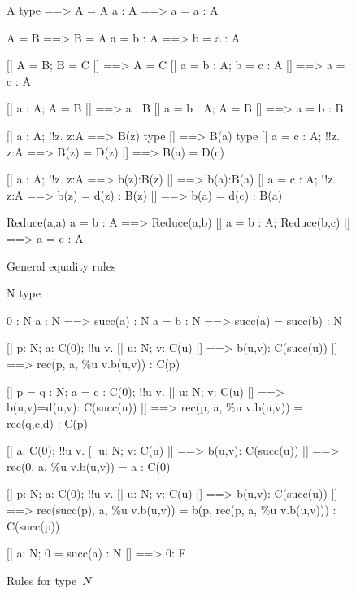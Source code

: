 \begin{figure} 
\begin{ttbox}
         A type ==> A = A
         a : A ==> a = a : A

          A = B ==> B = A
          a = b : A ==> b = a : A

        [| A = B;  B = C |] ==> A = C
        [| a = b : A;  b = c : A |] ==> a = c : A

       [| a : A;  A = B |] ==> a : B
      [| a = b : A;  A = B |] ==> a = b : B

        [| a : A;  !!z. z:A ==> B(z) type |] ==> B(a) type
       [| a = c : A;  !!z. z:A ==> B(z) = D(z) 
                  |] ==> B(a) = D(c)

        [| a : A;  !!z. z:A ==> b(z):B(z) |] ==> b(a):B(a)
       [| a = c : A;  !!z. z:A ==> b(z) = d(z) : B(z) 
                  |] ==> b(a) = d(c) : B(a)

          Reduce(a,a)
      a = b : A ==> Reduce(a,b)
         [| a = b : A;  Reduce(b,c) |] ==> a = c : A
\end{ttbox}
\caption{General equality rules} \label{ctt-equality}
\end{figure}


\begin{figure} 
\begin{ttbox}
        N type

       0 : N
   a : N ==> succ(a) : N
  a = b : N ==> succ(a) = succ(b) : N

        [| p: N;  a: C(0);  
             !!u v. [| u: N; v: C(u) |] ==> b(u,v): C(succ(u)) 
          |] ==> rec(p, a, \%u v.b(u,v)) : C(p)

       [| p = q : N;  a = c : C(0);  
             !!u v. [| u: N; v: C(u) |] ==> b(u,v)=d(u,v): C(succ(u))
          |] ==> rec(p, a, \%u v.b(u,v)) = rec(q,c,d) : C(p)

       [| a: C(0);  
             !!u v. [| u: N; v: C(u) |] ==> b(u,v): C(succ(u))
          |] ==> rec(0, a, \%u v.b(u,v)) = a : C(0)

   [| p: N;  a: C(0);  
             !!u v. [| u: N; v: C(u) |] ==> b(u,v): C(succ(u)) 
          |] ==> rec(succ(p), a, \%u v.b(u,v)) =
                 b(p, rec(p, a, \%u v.b(u,v))) : C(succ(p))

      [| a: N;  0 = succ(a) : N |] ==> 0: F
\end{ttbox}
\caption{Rules for type~$N$} \label{ctt-N}
\end{figure}


